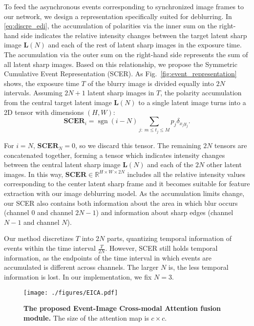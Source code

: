 \documentclass[runningheads]{llncs}
\newcommand{\vL}{\mathbf{L}}
\DeclareMathOperator*{\signum}{sgn}
\newlength \g
\begin{document}
To feed the asynchronous events corresponding to synchronized image frames to our network, we design a representation specifically suited for deblurring. In \eqref{eq:discre_edi}, the accumulation of polarities via the inner sum on the right-hand side indicates the relative intensity changes between the target latent sharp image $\vL(N)$ and each of the rest of latent sharp images in the exposure time. The accumulation via the outer sum on the right-hand side represents the sum of all latent sharp images. Based on this relationship, we propose the Symmetric Cumulative Event Representation (SCER). As Fig.~\ref{fig:event_representation} shows, the exposure time $T$ of the blurry image is divided equally into $2N$ intervals. Assuming $2N+1$ latent sharp images in $T$, the polarity accumulation from the central target latent image $\vL(N)$ to a single latent image turns into a 2D tensor with dimensions $(H,W)$:
\begin{equation} \label{eq:SCER}
\mathbf{SCER}_i = \signum(i-N) \sum_{j:\;m \leq t_j \leq M} p_j\delta_{x_j y_j}.
\end{equation}

For $i=N$, $\mathbf{SCER}_N = 0$, so we discard this tensor. The remaining $2N$ tensors are concatenated together, forming a tensor which indicates intensity changes between the central latent sharp image $\vL(N)$ and each of the $2N$ other latent images. In this way, $\mathbf{SCER} \in \mathbb{R}^{H\times W \times 2N}$ includes all the relative intensity values corresponding to the center latent sharp frame and it becomes suitable for feature extraction with our image deblurring model. As the accumulation limits change, our SCER also contains both information about the area in which blur occurs (channel 0 and channel $2N-1$) and information about sharp edges (channel $N-1$ and channel $N$).

Our method discretizes $T$ into $2N$ parts, quantizing temporal information of events within the time interval $\frac{T}{2N}$. However, SCER still holds temporal information, as the endpoints of the time interval in which events are accumulated is different across channels. The larger $N$ is, the less temporal information is lost. In our implementation, we fix $N=3$.



\begin{wrapfigure}{l}{0.5\textwidth}
  \vspace{-30pt}
  \begin{center}
   \texttt{[image: ./figures/EICA.pdf]}
  \end{center}
  \vspace{-10pt}
  \caption{\textbf{The proposed Event-Image Cross-modal Attention fusion module.} The size of the attention map is $c\times c$.}
  \vspace{-20pt}
  \label{fig:EICA}
\end{wrapfigure}
\end{document}
